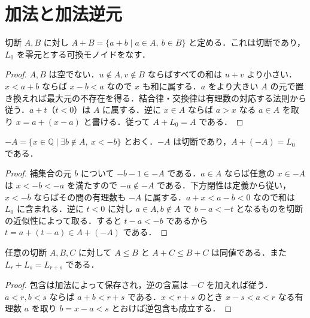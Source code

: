 \section{加法と加法逆元}
\begin{defn}[切断の加法]
切断 $A,B$ に対し $A+B=\{a+b\mid a\in A,\ b\in B\}$ と定める．これは切断であり，$L_0$ を零元とする可換モノイドをなす．
\end{defn}
\begin{proof}
$A,B$ は空でない．$u\notin A,v\notin B$ ならばすべての和は $u+v$ より小さい．$x<a+b$ ならば $x-b<a$ なので $x$ も和に属する．$a$ をより大きい $A$ の元で置き換えれば最大元の不存在を得る．結合律・交換律は有理数の対応する法則から従う．$a+t$（$t<0$）は $A$ に属する．逆に $x\in A$ ならば $a>x$ なる $a\in A$ を取り $x=a+(x-a)$ と書ける．従って $A+L_0=A$ である．
\end{proof}
\begin{prop}[切断の加法逆元]
$-A=\{x\in\mathbb Q\mid \exists b\notin A,\ x<-b\}$ とおく．$-A$ は切断であり，$A+(-A)=L_0$ である．
\end{prop}
\begin{proof}
補集合の元 $b$ について $-b-1\in -A$ である．$a\in A$ ならば任意の $x\in-A$ は $x<-b<-a$ を満たすので $-a\notin-A$ である．下方閉性は定義から従い，$x<-b$ ならばその間の有理数も $-A$ に属する．$a+x<a-b<0$ なので和は $L_0$ に含まれる．逆に $t<0$ に対し $a\in A,b\notin A$ で $b-a<-t$ となるものを切断の近似性によって取る．すると $t-a<-b$ であるから $t=a+(t-a)\in A+(-A)$ である．
\end{proof}
\begin{prop}[加法と切断の順序]
任意の切断 $A,B,C$ に対して $A\leq B$ と $A+C\leq B+C$ は同値である．また $L_r+L_s=L_{r+s}$ である．
\end{prop}
\begin{proof}
包含は加法によって保存され，逆の含意は $-C$ を加えれば従う．$a<r,b<s$ ならば $a+b<r+s$ である．$x<r+s$ のとき $x-s<a<r$ なる有理数 $a$ を取り $b=x-a<s$ とおけば逆包含も成立する．
\end{proof}
